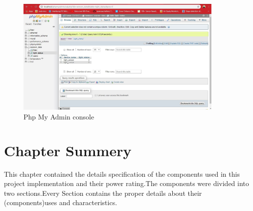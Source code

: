 \begin{figure}
  \centering
  \includegraphics[width=4in,height=2.5 in]{11}
  \caption{Php My Admin console}\label{fig11}
\end{figure}
\section{Chapter Summery}
This chapter contained the details specification of the components used in this project implementation and their power rating.The components were divided into two sections.Every Section contains the proper details about their (components)uses and characteristics. 